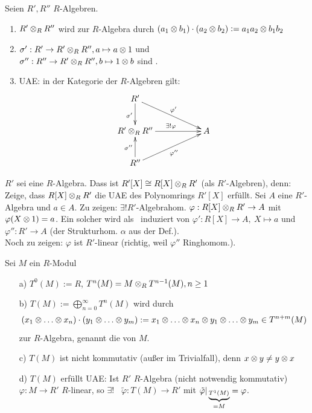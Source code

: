 \documentclass[a4paper, 10pt]{report}
\begin{document}
\begin{Prop}
\label{1.16}
Seien $R', R''$ $R$-Algebren.
\begin{enumerate}
\item $R'\ten[R] R''$ wird zur $R$-Algebra durch $(a_1\ten b_1)\cdot (a_2 \ten b_2)\defeqr a_1a_2\ten b_1 b_2$
\item $\sigma': R'\to R'\ten[R] R'', a\mapsto a\ten 1$ und \\
$\sigma'': R''\to R'\ten[R] R'', b\mapsto 1\ten b$
sind \RAlgHoms.
\item UAE: in der Kategorie der $R$-Algebren gilt:
\[
\begin{xy}
\xymatrix{
R' \ar[d]_{\sigma'} \ar[drr]^{\varphi'}    & & \\
R' \ten[R] R'' \ar[rr]^{\exists!\varphi} & & A \\
R'' \ar[u]^{\sigma''} \ar[urr]_{\varphi''} & &
}
\end{xy}
\]
\end{enumerate}
\end{Prop}

\begin{nnBsp} $R'$ sei eine $R$-Algebra. Dass ist $R'[X] \cong R[X] \ten[R] R'$ (als $R'$-Algebren), denn: Zeige, dass $R[X] \ten[R] R'$ 
die UAE des Polynomrings $R'[X]$ erfüllt. 
Sei $A$ eine $R'$-Algebra und $a \in A$. Zu zeigen: $\exists ! R'$-Algebrahom. $\varphi: R[X] \ten[R] R' \rightarrow A$ mit
$\varphi(X \ten 1 ) = a$. Ein solcher wird als \RAlgHom\ induziert von $\varphi': R[X] \to A,\ X \mapsto a$
und $\varphi'': R' \rightarrow A$ (der Strukturhom. $\alpha$ aus der Def.).\\
Noch zu zeigen: $\varphi$ ist $R'$-linear (richtig, weil $\varphi''$ Ringhomom.).
\end{nnBsp}

\begin{DefBem}
Sei $M$ ein $R$-Modul
\begin{enumerate}
\item[ a)] $T^0(M) := R$, $ T^n(M) = M \ten[R] T^{n-1}(M), n \geq 1$
\item[ b)] $T(M) := \bigoplus^{\infty}_{n = 0 } T^n(M)$ wird durch
\[
(x_1 \ten \dots \ten x_n) \cdot (y_1 \ten \dots \ten y_m) :=
x_1 \ten \dots \ten x_n \ten y_1 \ten \dots \ten y_m \in T^{n + m}(M)
\]
zur $R$-Algebra, genannt die
 von $M$.
\item[ c)] $T(M)$ ist nicht kommutativ (außer im Trivialfall), denn $ x \ten y \neq y \ten x$
\item[ d)] $T(M)$ erfüllt UAE: Ist $R'$ $R$-Algebra (nicht notwendig
kommutativ) $\varphi: M \rightarrow R'$ $R$-linear, so $\exists!$ \RAlgHom\ 
$\tilde{\varphi}:T(M) \rightarrow R'$ mit $\tilde{\varphi}|\underbrace{_{T^1(M)}}_{=M}=\varphi$.
\end{enumerate}
\end{DefBem}
\end{document}
